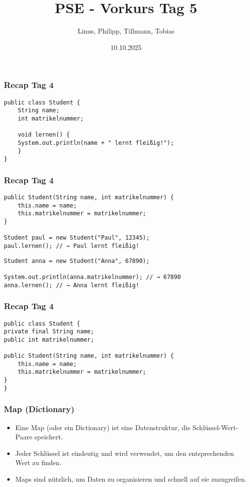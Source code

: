 \documentclass{../../presentation}
\title{PSE - Vorkurs Tag 5}
\author{Linus, Philipp, Tillmann, Tobias}
\institute{FIUS - Fachgruppe Informatik Universität Stuttgart}
\date{10.10.2025}
\begin{document}
\begin{frame}
	\titlepage
\end{frame}

\begin{frame}[fragile]
	\frametitle{Recap Tag 4}
	\pause
	\begin{verbatim}
public class Student {
    String name;
    int matrikelnummer;

    void lernen() {
	System.out.println(name + " lernt fleißig!");
    }
}
	\end{verbatim}
\end{frame}

\begin{frame}[fragile]
	\frametitle{Recap Tag 4}
	\pause
	\begin{verbatim}
public Student(String name, int matrikelnummer) {
	this.name = name;
	this.matrikelnummer = matrikelnummer;
}

Student paul = new Student("Paul", 12345);
paul.lernen(); // → Paul lernt fleißig!
	\end{verbatim}
	\pause
	\begin{verbatim}
Student anna = new Student("Anna", 67890);

System.out.println(anna.matrikelnummer); // → 67890
anna.lernen(); // → Anna lernt fleißig!
	\end{verbatim}
\end{frame}

\begin{frame}[fragile]
	\frametitle{Recap Tag 4}
	\pause
	\begin{verbatim}
public class Student {
private final String name;
public int matrikelnummer;

public Student(String name, int matrikelnummer) {
	this.name = name;
	this.matrikelnummer = matrikelnummer;
}
}
	\end{verbatim}
\end{frame}

\begin{frame}[fragile]
	\frametitle{Map (Dictionary)}
	\begin{itemize}
		\item Eine Map (oder ein Dictionary) ist eine Datenstruktur, die Schlüssel-Wert-Paare speichert.
		\item Jeder Schlüssel ist eindeutig und wird verwendet, um den entsprechenden Wert zu finden.
		\item Maps sind nützlich, um Daten zu organisieren und schnell auf sie zuzugreifen.
	\end{itemize}
\end{frame}
\end{document}
